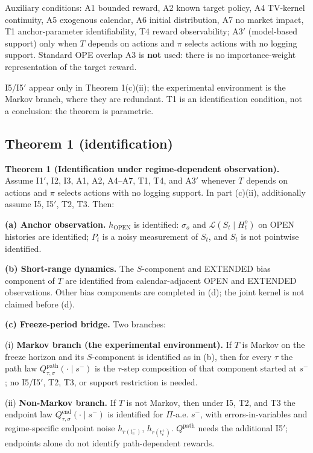 Auxiliary conditions: A1 bounded reward, A2 known target policy, A4 TV-kernel continuity, A5 exogenous calendar, A6 initial distribution, A7 no market impact, T1 anchor-parameter identifiability, T4 reward observability; A3$'$ (model-based support) only when $T$ depends on actions and $\pi$ selects actions with no logging support. Standard OPE overlap A3 is \textbf{not} used: there is no importance-weight representation of the target reward.

I5/I5$'$ appear only in Theorem 1(c)(ii); the experimental environment is the Markov branch, where they are redundant. T1 is an identification condition, not a conclusion: the theorem is parametric.

\subsection{Theorem 1 (identification)}

\textbf{Theorem 1 (Identification under regime-dependent observation).} Assume I1$'$, I2, I3, A1, A2, A4--A7, T1, T4, and A3$'$ whenever $T$ depends on actions and $\pi$ selects actions with no logging support. In part (c)(ii), additionally assume I5, I5$'$, T2, T3. Then:

\textbf{(a) Anchor observation.} $h_{\mathrm{OPEN}}$ is identified: $\sigma_o$ and $\mathcal L(S_t\mid H_t^o)$ on OPEN histories are identified; $P_t$ is a noisy measurement of $S_t$, and $S_t$ is not pointwise identified.

\textbf{(b) Short-range dynamics.} The $S$-component and EXTENDED bias component of $T$ are identified from calendar-adjacent OPEN and EXTENDED observations. Other bias components are completed in (d); the joint kernel is not claimed before (d).

\textbf{(c) Freeze-period bridge.} Two branches:

(i) \textbf{Markov branch (the experimental environment).} If $T$ is Markov on the freeze horizon and its $S$-component is identified as in (b), then for every $\tau$ the path law $Q^{\mathrm{path}}_{\tau,\sigma}(\cdot\mid s^-)$ is the $\tau$-step composition of that component started at $s^-$; no I5/I5$'$, T2, T3, or support restriction is needed.

(ii) \textbf{Non-Markov branch.} If $T$ is not Markov, then under I5, T2, and T3 the endpoint law $Q^{\mathrm{end}}_{\tau,\sigma}(\cdot\mid s^-)$ is identified for $\Pi$-a.e. $s^-$, with errors-in-variables and regime-specific endpoint noise $h_{r(t_e^-)}$, $h_{r(t_e^+)}$. $Q^{\mathrm{path}}$ needs the additional I5$'$; endpoints alone do not identify path-dependent rewards.

